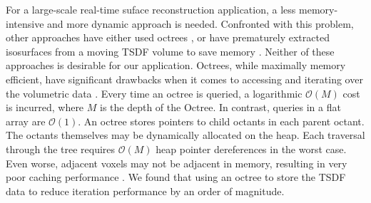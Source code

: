 \documentclass[conference]{IEEEtran}
\begin{document}
For a large-scale real-time suface reconstruction application, a less
memory-intensive and more dynamic approach is needed. Confronted with this
problem, other approaches have either used  octrees \cite{Wurm2010, Zeng2012,
Chen2012}, or have prematurely extracted isosurfaces from a moving TSDF volume to save
memory \cite{Whelan2013}. Neither of these approaches is desirable for our application.
Octrees, while maximally memory efficient, have significant drawbacks when it comes to
accessing and iterating over the volumetric data \cite{NiessnerHashing}. Every
time an octree is queried,  a logarithmic $\mathcal{O}(M)$ cost is incurred, where $M$ is the depth of the
Octree. In contrast, queries in a flat array are $\mathcal{O}(1)$. An octree
stores pointers to child octants in each parent octant. The octants themselves
may be dynamically allocated on the heap. Each traversal through the tree
requires $\mathcal{O}(M)$ heap pointer dereferences in the worst case.
Even worse, adjacent voxels may not be adjacent in memory, resulting in very
poor caching performance \cite{CacheStructures}.  We found that using an octree
to store the TSDF data to reduce iteration performance by an order of magnitude.
\end{document}
